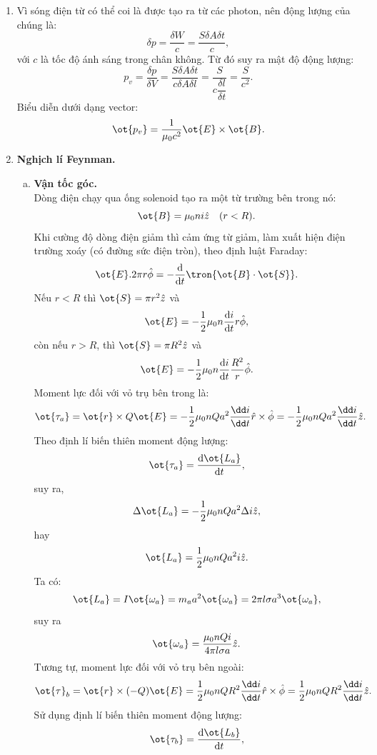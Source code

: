 \begin{loigiai}
    

\begin{enumerate}[1)]
    \item Vì sóng điện từ có thể coi là được tạo ra từ các photon, nên động lượng của chúng là:
$$\delta p=\dfrac{\delta W}{c}=\dfrac{S\delta A \delta t}{c},$$
với $c$ là tốc độ ánh sáng trong chân không. Từ đó suy ra mật độ động lượng:
$$p_v=\dfrac{\delta p}{\delta V}=\dfrac{S \delta A \delta t}{c\delta A \delta l}=\dfrac{S}{c\dfrac{\delta l}{\delta t}}=\dfrac{S}{c^2}.$$
Biểu diễn dưới dạng vector:
$$\ot{p_v}=\dfrac{1}{\mu_0 c^2}\ot{E}\times\ot{B}.$$
    \item \textbf{Nghịch lí Feynman.}
    \begin{enumerate}[a)]
        \item \textbf{Vận tốc góc.}\\
        Dòng điện chạy qua ống solenoid tạo ra một từ trường bên trong nó:
        $$\ot{B}=\mu_0 ni\hat{z} \quad (r<R).$$
        Khi cường độ dòng điện giảm thì cảm ứng từ giảm, làm xuất hiện điện trường xoáy (có đường sức điện tròn), theo định luật Faraday:
        $$\ot{E}.2\pi r \hat{\phi}=-\dfrac{\mathrm{d}}{\mathrm{d}t}\tron{\ot{B}\cdot\ot{S}}.$$
        Nếu $r<R$ thì $\ot{S}=\pi r^2 \hat{z}$ và
        $$\ot{E}=-\dfrac{1}{2}\mu_0 n\dfrac{\mathrm{d}i}{\mathrm{d}t}r\hat{\phi},$$
        còn nếu $r>R$, thì $\ot{S}=\pi R^2 \hat{z}$ và
         $$\ot{E}=-\dfrac{1}{2}\mu_0 n\dfrac{\mathrm{d}i}{\mathrm{d}t}\dfrac{R^2}{r}\hat{\phi}.$$
         Moment lực đối với vỏ trụ bên trong là: 
         $$\ot{\tau_a}=\ot{r} \times Q \ot{E}=-\frac{1}{2} \mu_{0} n Q a^{2} \frac{\dd i}{\dd t} \hat{r} \times \hat{\phi}=-\frac{1}{2} \mu_{0} n Q a^{2} \frac{\dd i}{\dd t} \hat{z}.$$
         Theo định lí biến thiên moment động lượng:
         $$\ot{\tau_a}=\dfrac{\mathrm{d}\ot{L_a}}{\mathrm{d}t},$$
         suy ra, 
         $$\Delta \ot{L_a}=-\dfrac{1}{2}\mu_0 n Q a^2 \Delta i \hat{z},$$
         hay
         $$\ot{L_a}=\dfrac{1}{2}\mu_0 n Q a^2 i \hat{z}.$$
         Ta có:
         $$\ot{L_a}=I\ot{\omega_a}=m_a a^2\ot{\omega_a}=2\pi l \sigma a^3 \ot{\omega_a},$$
         suy ra
         $$\ot{\omega_a}=\dfrac{\mu_0 nQi}{4\pi l\sigma a}\hat{z}.$$
         Tương tự, moment lực đối với vỏ trụ bên ngoài:
         $$\ot{\tau}_{b}=\ot{r} \times (-Q) \ot{E}=\frac{1}{2} \mu_{0} n Q R^{2} \frac{\dd i}{\dd t} \hat{r} \times \hat{\phi}=\frac{1}{2} \mu_{0} n Q R^{2} \frac{\dd i}{\dd t} \hat{z}.$$
         Sử dụng định lí biến thiên moment động lượng:
         $$\ot{\tau_b}=\dfrac{\mathrm{d}\ot{L_b}}{\mathrm{d}t},$$

\end{enumerate}
\end{enumerate}
\end{loigiai}
